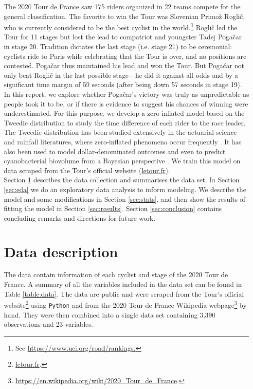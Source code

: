 \documentclass[aos,preprint]{imsart}
\begin{document}
The 2020 Tour de France saw 175 riders organized in 22 teams compete for the general classification. The favorite to win the Tour was Slovenian Primož Roglič, who is currently considered to be the best cyclist in the world.\footnote{See \url{https://www.uci.org/road/rankings.}} Roglič led the Tour for 11 stages but lost the lead to compatriot and youngster Tadej Pogačar in stage 20. Tradition dictates the last stage (i.e. stage 21) to be ceremonial: cyclists ride to Paris while celebrating that the Tour is over, and no positions are contested. Pogačar thus maintained his lead and won the Tour. But Pogačar not only beat Roglič in the last possible stage---he did it against all odds and by a significant time margin of 59 seconds (after being down 57 seconds in stage 19). \\


In this report, we explore whether Pogačar's victory was truly as unpredictable as people took it to be, or if there is evidence to suggest his chances of winning were underestimated. For this purpose, we develop a zero-inflated model based on the Tweedie distribution to study the time difference of each rider to the race leader. The Tweedie distribution has been studied extensively in the actuarial science and rainfall literatures, where zero-inflated phenomena occur frequently \citep[see][and references therein]{jorgensen1994, withers2011}. It has also been used to model dollar-denominated outcomes \citep{lauderdale2012} and even to predict cyanobacterial biovolume from a Bayesian perspective \citep{haakonsson2020}. We train this model on data scraped from the Tour's official website (\url{letour.fr}). \\


Section \ref{sec:data} describes the data collection and summarises the data set. In Section \ref{sec:eda} we do an exploratory data analysis to inform modeling. We describe the model and some modifications in Section \ref{sec:stats}, and then show the results of fitting the model in Section \ref{sec:results}. Section \ref{sec:conclusion} contains concluding remarks and directions for future work.


\section{Data description} \label{sec:data}


The data contain information of each cyclist and stage of the 2020 Tour de France. A summary of all the variables included in the data set can be found in Table \ref{table:data}. The data are public and were scraped from the Tour's official website\footnote{\url{letour.fr}.} using \texttt{Python} and from the 2020 Tour de France Wikipedia webpage\footnote{\url{https://en.wikipedia.org/wiki/2020_Tour_de_France}.} by hand. They were then combined into a single data set containing 3,390 observations and 23 variables. \\
\end{document}
